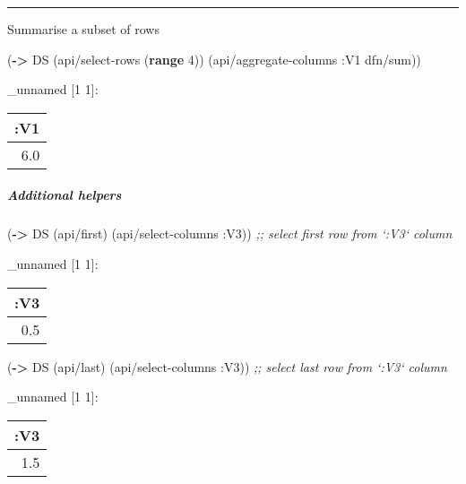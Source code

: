 \documentclass[]{article}
\newenvironment{Shaded}{\begin{snugshade}}{\end{snugshade}}
\newcommand{\KeywordTok}[1]{\textcolor[rgb]{0.13,0.29,0.53}{\textbf{#1}}}
\newcommand{\DecValTok}[1]{\textcolor[rgb]{0.00,0.00,0.81}{#1}}
\newcommand{\CommentTok}[1]{\textcolor[rgb]{0.56,0.35,0.01}{\textit{#1}}}
\newcommand{\AttributeTok}[1]{\textcolor[rgb]{0.77,0.63,0.00}{#1}}
\newcommand{\NormalTok}[1]{#1}
\let\oldsubparagraph\subparagraph
\renewcommand{\subparagraph}[1]{\oldsubparagraph{#1}\mbox{}}
\begin{document}
\begin{center}\rule{0.5\linewidth}{0.5pt}\end{center}

Summarise a subset of rows

\begin{Shaded}
\begin{Highlighting}[]
\NormalTok{(}\KeywordTok{->}\NormalTok{ DS}
\NormalTok{    (api/select-rows (}\KeywordTok{range} \DecValTok{4}\NormalTok{))}
\NormalTok{    (api/aggregate-columns }\AttributeTok{:V1}\NormalTok{ dfn/sum))}
\end{Highlighting}
\end{Shaded}

\_unnamed {[}1 1{]}:

\begin{longtable}[]{@{}r@{}}
\toprule
:V1\tabularnewline
\midrule
\endhead
6.0\tabularnewline
\bottomrule
\end{longtable}

\subparagraph{Additional helpers}\label{additional-helpers}

\begin{Shaded}
\begin{Highlighting}[]
\NormalTok{(}\KeywordTok{->}\NormalTok{ DS}
\NormalTok{    (api/first)}
\NormalTok{    (api/select-columns }\AttributeTok{:V3}\NormalTok{)) }\CommentTok{;; select first row from `:V3` column}
\end{Highlighting}
\end{Shaded}

\_unnamed {[}1 1{]}:

\begin{longtable}[]{@{}r@{}}
\toprule
:V3\tabularnewline
\midrule
\endhead
0.5\tabularnewline
\bottomrule
\end{longtable}

\begin{Shaded}
\begin{Highlighting}[]
\NormalTok{(}\KeywordTok{->}\NormalTok{ DS}
\NormalTok{    (api/last)}
\NormalTok{    (api/select-columns }\AttributeTok{:V3}\NormalTok{)) }\CommentTok{;; select last row from `:V3` column}
\end{Highlighting}
\end{Shaded}

\_unnamed {[}1 1{]}:

\begin{longtable}[]{@{}r@{}}
\toprule
:V3\tabularnewline
\midrule
\endhead
1.5\tabularnewline
\bottomrule
\end{longtable}
\end{document}
